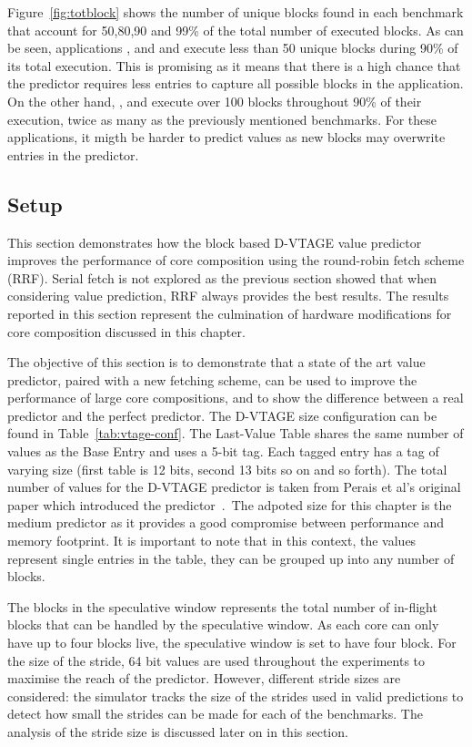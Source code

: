 Figure~\ref{fig:totblock} shows the number of unique blocks found in each benchmark that account for 50,80,90 and 99\% of the total number of executed blocks.
As can be seen, applications ,  and   and  execute less than 50 unique blocks during 90\% of its total execution.
This is promising as it means that there is a high chance that the predictor requires less entries to capture all possible blocks in the application.
On the other hand, , and  execute over 100 blocks throughout 90\% of their execution, twice as many as the previously mentioned benchmarks.
For these applications, it migth be harder to predict values as new blocks may overwrite entries in the predictor.


\subsection{Setup}
This section demonstrates how the block based D-VTAGE value predictor improves the performance of core composition using the round-robin fetch scheme (RRF).
Serial fetch is not explored as the previous section showed that when considering value prediction, RRF always provides the best results.
The results reported in this section represent the culmination of hardware modifications for core composition discussed in this chapter.

The objective of this section is to demonstrate that a state of the art value predictor, paired with a new fetching scheme, can be used to improve the performance of large core compositions, and to show the difference between a real predictor and the perfect predictor.
The D-VTAGE size configuration can be found in Table~\ref{tab:vtage-conf}.
The Last-Value Table shares the same number of values as the Base Entry and uses a 5-bit tag.
Each tagged entry has a tag of varying size (first table is 12 bits, second 13 bits so on and so forth).
The total number of values for the D-VTAGE predictor is taken from Perais et al's original paper which introduced the predictor~\cite{peraisBeBop2015}.\
The adpoted size for this chapter is the medium predictor as it provides a good compromise between performance and memory footprint.
It is important to note that in this context, the values represent single entries in the table, they can be grouped up into any number of blocks.

The blocks in the speculative window represents the total number of in-flight blocks that can be handled by the speculative window.
As each core can only have up to four blocks live, the speculative window is set to have four block.
For the size of the stride, 64 bit values are used throughout the experiments to maximise the reach of the predictor.
However, different stride sizes are considered: the simulator tracks the size of the strides used in valid predictions to detect how small the strides can be made for each of the benchmarks.
The analysis of the stride size is discussed later on in this section.

